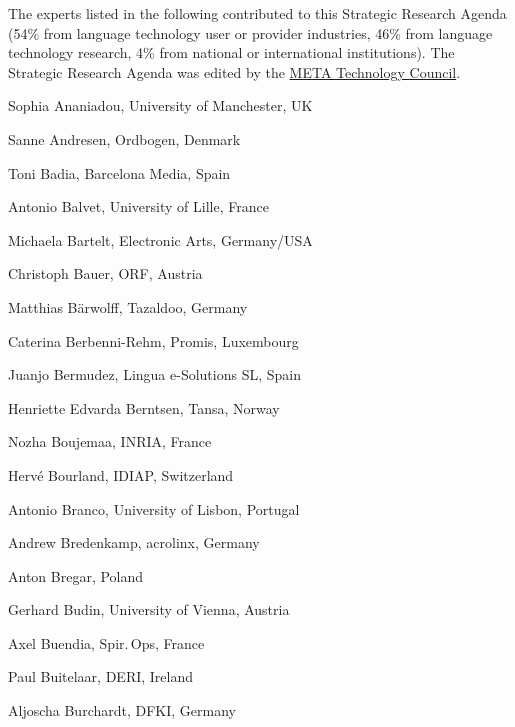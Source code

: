 \documentclass[10pt, plain]{../../metanetpaper}
\begin{document}
\label{sec:list-of-contributors}

The experts listed in the following contributed to this Strategic Research Agenda (54\% from language technology user or provider industries, 46\% from language technology research, 4\% from national or international institutions). The Strategic Research Agenda was edited by the \href{http://www.meta-net.eu/vision/technology-council-members/all}{META Technology Council}.

%

\begin{multicols}{3}
\begin{small}
  \begin{enumerate}
    \raggedright{
      \item Sophia Ananiadou, University of Manchester, UK
      \item Sanne Andresen, Ordbogen, Denmark
      \item Toni Badia, Barcelona Media, Spain
      \item Antonio Balvet, University of Lille, France
      \item Michaela Bartelt, Electronic Arts, Germany/USA
      \item Christoph Bauer, ORF, Austria
      \item Matthias Bärwolff, Tazaldoo, Germany
      \item Caterina Berbenni-Rehm, Promis, Luxembourg
      \item Juanjo Bermudez, Lingua e-Solutions SL, Spain
      \item Henriette Edvarda Berntsen, Tansa, Norway
      \item Nozha Boujemaa, INRIA, France
      \item Hervé Bourland, IDIAP, Switzerland
      \item Antonio Branco, University of Lisbon, Portugal
      \item Andrew Bredenkamp, acrolinx, Germany
      \item Anton Bregar, Poland
      \item Gerhard Budin, University of Vienna, Austria
      \item Axel Buendia, Spir.\,Ops, France
      \item Paul Buitelaar, DERI, Ireland
      \item Aljoscha Burchardt, DFKI, Germany
}
\end{enumerate}
\end{small}
\end{multicols}
\end{document}
